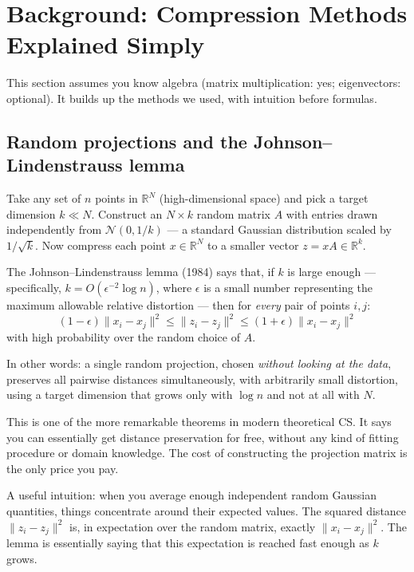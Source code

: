 \documentclass[11pt]{article}
\begin{document}
\newpage

\section{Background: Compression Methods Explained Simply}

This section assumes you know algebra (matrix multiplication: yes; eigenvectors: optional). It builds up the methods we used, with intuition before formulas.

\subsection{Random projections and the Johnson--Lindenstrauss lemma}

Take any set of $n$ points in $\mathbb{R}^N$ (high-dimensional space) and pick a target dimension $k \ll N$. Construct an $N \times k$ random matrix $A$ with entries drawn independently from $\mathcal{N}(0, 1/k)$ --- a standard Gaussian distribution scaled by $1/\sqrt{k}$. Now compress each point $x \in \mathbb{R}^N$ to a smaller vector $z = x A \in \mathbb{R}^k$.

The Johnson--Lindenstrauss lemma (1984) says that, if $k$ is large enough --- specifically, $k = O(\epsilon^{-2} \log n)$, where $\epsilon$ is a small number representing the maximum allowable relative distortion --- then for \emph{every} pair of points $i, j$:
\[
(1 - \epsilon) \|x_i - x_j\|^2 \le \|z_i - z_j\|^2 \le (1 + \epsilon) \|x_i - x_j\|^2
\]
with high probability over the random choice of $A$.

In other words: a single random projection, chosen \emph{without looking at the data}, preserves all pairwise distances simultaneously, with arbitrarily small distortion, using a target dimension that grows only with $\log n$ and not at all with $N$.

This is one of the more remarkable theorems in modern theoretical CS. It says you can essentially get distance preservation for free, without any kind of fitting procedure or domain knowledge. The cost of constructing the projection matrix is the only price you pay.

A useful intuition: when you average enough independent random Gaussian quantities, things concentrate around their expected values. The squared distance $\|z_i - z_j\|^2$ is, in expectation over the random matrix, exactly $\|x_i - x_j\|^2$. The lemma is essentially saying that this expectation is reached fast enough as $k$ grows.
\end{document}
